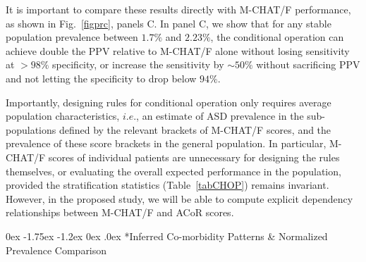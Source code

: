 \documentclass[onecolumn, compsoc,11pt]{IEEEtran}
\makeatletter
\renewcommand\subsection{\@startsection {subsection}{2}{\z@}%
                                   {0ex \@plus -1.75ex \@minus -1.2ex}%
                                   {0ex \@plus.0ex}%
                                   {\fontsize{11}{11}\selectfont\bfseries\sffamily\color{black}}}
\def\ZERO{ACoR\xspace}
\makeatother
\begin{document}
It is important to compare these results directly with M-CHAT/F performance, as shown in Fig.~\ref{figprc}, panels C. In panel C, we show that for any stable population prevalence between 
$1.7\%$ and $2.23\%$, the conditional operation can achieve  double the PPV relative to M-CHAT/F alone without losing sensitivity at $>98\%$ specificity, or increase the sensitivity by $\sim 50\%$ without sacrificing PPV and   not letting the  specificity to drop below $94\%$.
%

Importantly, designing  rules for  conditional  operation  only requires average population characteristics, $i.e.$, an  estimate of ASD prevalence in the sub-populations defined by the  relevant brackets of M-CHAT/F scores, and the prevalence of these score brackets in the general population. In particular,   M-CHAT/F scores of individual patients are unnecessary for designing the rules themselves, or evaluating the overall expected performance in the population, provided the stratification statistics (Table~\ref{tabCHOP}) remains invariant. However, in the proposed study, we will be able to compute explicit dependency relationships between M-CHAT/F and \ZERO scores.
%

\subsection*{Inferred Co-morbidity Patterns \& Normalized Prevalence Comparison}
\end{document}
